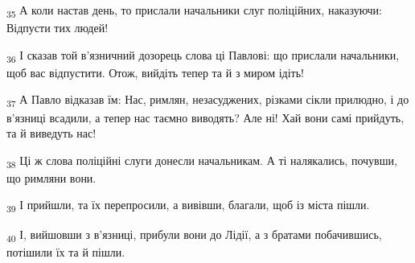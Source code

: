 \begin{tcolorbox}
\textsubscript{35} А коли настав день, то прислали начальники слуг поліційних, наказуючи: Відпусти тих людей!
\end{tcolorbox}
\begin{tcolorbox}
\textsubscript{36} І сказав той в'язничний дозорець слова ці Павлові: що прислали начальники, щоб вас відпустити. Отож, вийдіть тепер та й з миром ідіть!
\end{tcolorbox}
\begin{tcolorbox}
\textsubscript{37} А Павло відказав їм: Нас, римлян, незасуджених, різками сікли прилюдно, і до в'язниці всадили, а тепер нас таємно виводять? Але ні! Хай вони самі прийдуть, та й виведуть нас!
\end{tcolorbox}
\begin{tcolorbox}
\textsubscript{38} Ці ж слова поліційні слуги донесли начальникам. А ті налякались, почувши, що римляни вони.
\end{tcolorbox}
\begin{tcolorbox}
\textsubscript{39} І прийшли, та їх перепросили, а вивівши, благали, щоб із міста пішли.
\end{tcolorbox}
\begin{tcolorbox}
\textsubscript{40} І, вийшовши з в'язниці, прибули вони до Лідії, а з братами побачившись, потішили їх та й пішли.
\end{tcolorbox}
